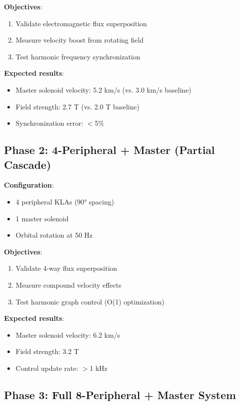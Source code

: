 \documentclass[12pt,a4paper]{article}
\begin{document}
\textbf{Objectives}:
\begin{enumerate}
\item Validate electromagnetic flux superposition
\item Measure velocity boost from rotating field
\item Test harmonic frequency synchronization
\end{enumerate}

\textbf{Expected results}:
\begin{itemize}
\item Master solenoid velocity: 5.2 km/s (vs. 3.0 km/s baseline)
\item Field strength: 2.7 T (vs. 2.0 T baseline)
\item Synchronization error: $<$5\%
\end{itemize}

\subsection{Phase 2: 4-Peripheral + Master (Partial Cascade)}

\textbf{Configuration}:
\begin{itemize}
\item 4 peripheral KLAs (90° spacing)
\item 1 master solenoid
\item Orbital rotation at 50 Hz
\end{itemize}

\textbf{Objectives}:
\begin{enumerate}
\item Validate 4-way flux superposition
\item Measure compound velocity effects
\item Test harmonic graph control (O(1) optimization)
\end{enumerate}

\textbf{Expected results}:
\begin{itemize}
\item Master solenoid velocity: 6.2 km/s
\item Field strength: 3.2 T
\item Control update rate: $>$1 kHz
\end{itemize}

\subsection{Phase 3: Full 8-Peripheral + Master System}
\end{document}
